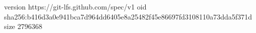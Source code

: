 version https://git-lfs.github.com/spec/v1
oid sha256:b416d3a0e941bca7d964dd6405e8a25482f45e86697fd3108110a73dda5f371d
size 2796368
